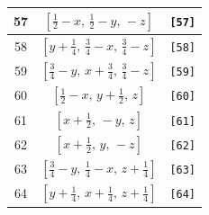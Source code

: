 \documentclass[fleqn,8pt]{jsarticle}
\begin{document}
\begin{longtable}{ccc}
57 & $\left[ \frac{1}{2} - x,\, \frac{1}{2} - y,\, - z \right]$ & {\tt [57]} \\ \hline
58 & $\left[ y + \frac{1}{4},\, \frac{3}{4} - x,\, \frac{3}{4} - z \right]$ & {\tt [58]} \\ \hline
59 & $\left[ \frac{3}{4} - y,\, x + \frac{3}{4},\, \frac{3}{4} - z \right]$ & {\tt [59]} \\ \hline
60 & $\left[ \frac{1}{2} - x,\, y + \frac{1}{2},\, z \right]$ & {\tt [60]} \\ \hline
61 & $\left[ x + \frac{1}{2},\, - y,\, z \right]$ & {\tt [61]} \\ \hline
62 & $\left[ x + \frac{1}{2},\, y,\, - z \right]$ & {\tt [62]} \\ \hline
63 & $\left[ \frac{3}{4} - y,\, \frac{1}{4} - x,\, z + \frac{1}{4} \right]$ & {\tt [63]} \\ \hline
64 & $\left[ y + \frac{1}{4},\, x + \frac{1}{4},\, z + \frac{1}{4} \right]$ & {\tt [64]} \\
\end{longtable}
\end{document}
